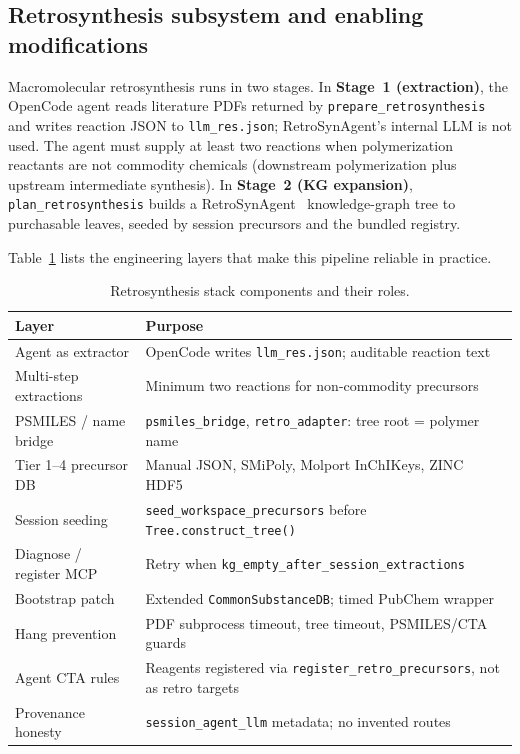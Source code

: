 \documentclass[twocolumn]{fairmeta}
\begin{document}
\subsection{Retrosynthesis subsystem and enabling modifications}
\label{sec:retro}

Macromolecular retrosynthesis runs in two stages.
In \textbf{Stage~1 (extraction)}, the OpenCode agent reads literature PDFs returned by \texttt{prepare\_retrosynthesis} and writes reaction JSON to \texttt{llm\_res.json}; RetroSynAgent's internal LLM is not used.
The agent must supply at least two reactions when polymerization reactants are not commodity chemicals (downstream polymerization plus upstream intermediate synthesis).
In \textbf{Stage~2 (KG expansion)}, \texttt{plan\_retrosynthesis} builds a RetroSynAgent~\cite{ma2025retrosynagent} knowledge-graph tree to purchasable leaves, seeded by session precursors and the bundled registry.

Table~\ref{tab:retro_stack} lists the engineering layers that make this pipeline reliable in practice.

\begin{table}[t]
\centering
\caption{Retrosynthesis stack components and their roles.}
\label{tab:retro_stack}
\small
\begin{tabularx}{\columnwidth}{lX}
\toprule
Layer & Purpose \\
\midrule
Agent as extractor & OpenCode writes \texttt{llm\_res.json}; auditable reaction text \\
Multi-step extractions & Minimum two reactions for non-commodity precursors \\
PSMILES / name bridge & \texttt{psmiles\_bridge}, \texttt{retro\_adapter}: tree root = polymer name \\
Tier 1--4 precursor DB & Manual JSON, SMiPoly, Molport InChIKeys, ZINC HDF5 \\
Session seeding & \texttt{seed\_workspace\_precursors} before \texttt{Tree.construct\_tree()} \\
Diagnose / register MCP & Retry when \texttt{kg\_empty\_after\_session\_extractions} \\
Bootstrap patch & Extended \texttt{CommonSubstanceDB}; timed PubChem wrapper \\
Hang prevention & PDF subprocess timeout, tree timeout, PSMILES/CTA guards \\
Agent CTA rules & Reagents registered via \texttt{register\_retro\_precursors}, not as retro targets \\
Provenance honesty & \texttt{session\_agent\_llm} metadata; no invented routes \\
\bottomrule
\end{tabularx}
\end{table}
\end{document}
